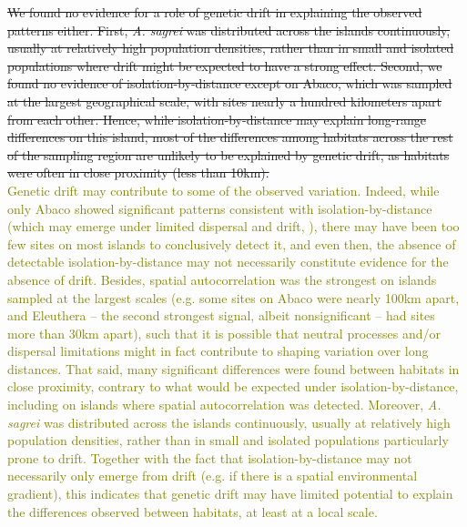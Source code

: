 \sout{We found no evidence for a role of genetic drift in explaining the observed patterns either. First, \textit{A. sagrei} was distributed across the islands continuously, usually at relatively high population densities, rather than in small and isolated populations where drift might be expected to have a strong effect. Second, we found no evidence of isolation-by-distance except on Abaco, which was sampled at the largest geographical scale, with sites nearly a hundred kilometers apart from each other. Hence, while isolation-by-distance may explain long-range differences on this island, most of the differences among habitats across the rest of the sampling region are unlikely to be explained by genetic drift, as habitats were often in close proximity (less than 10km).}\\

\textcolor{olive}{Genetic drift may contribute to some of the observed variation. Indeed, while only Abaco showed significant patterns consistent with isolation-by-distance (which may emerge under limited dispersal and drift, \citealt{Wright1943, Kimura1964, Slatkin1987}), there may have been too few sites on most islands to conclusively detect it, and even then, the absence of detectable isolation-by-distance may not necessarily constitute evidence for the absence of drift. Besides, spatial autocorrelation was the strongest on islands sampled at the largest scales (e.g. some sites on Abaco were nearly 100km apart, and Eleuthera -- the second strongest signal, albeit nonsignificant -- had sites more than 30km apart), such that it is possible that neutral processes and/or dispersal limitations might in fact contribute to shaping variation over long distances. That said, many significant differences were found between habitats in close proximity, contrary to what would be expected under isolation-by-distance, including on islands where spatial autocorrelation was detected. Moreover, \textit{A. sagrei} was distributed across the islands continuously, usually at relatively high population densities, rather than in small and isolated populations particularly prone to drift. Together with the fact that isolation-by-distance may not necessarily only emerge from drift (e.g. if there is a spatial environmental gradient), this indicates that genetic drift may have limited potential to explain the differences observed between habitats, at least at a local scale.}\\

